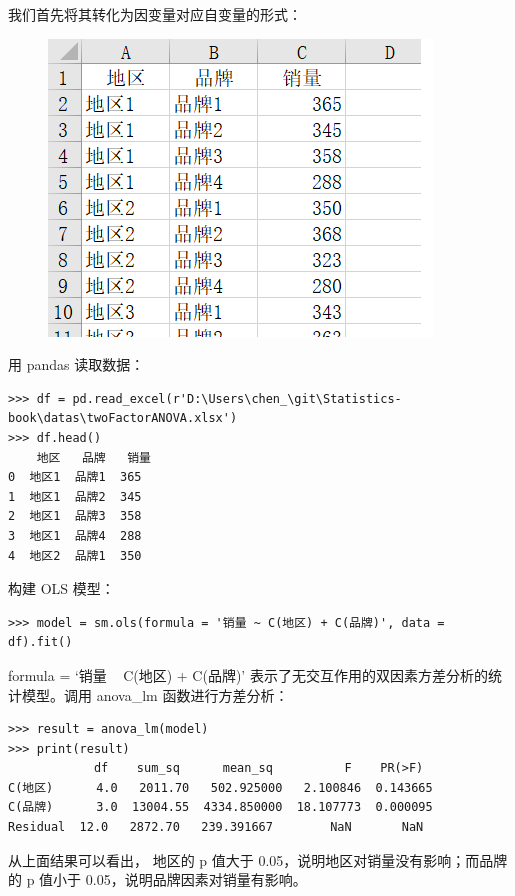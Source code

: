我们首先将其转化为因变量对应自变量的形式：

\begin{figure}[ht]
  \centering
  \includegraphics[scale=0.8]{figure/chapter3/twoFactor2.png}
\end{figure}

用 pandas 读取数据：

\begin{lstlisting}[Language=Python]
>>> df = pd.read_excel(r'D:\Users\chen_\git\Statistics-book\datas\twoFactorANOVA.xlsx')
>>> df.head()
    地区   品牌   销量
0  地区1  品牌1  365
1  地区1  品牌2  345
2  地区1  品牌3  358
3  地区1  品牌4  288
4  地区2  品牌1  350
\end{lstlisting}

构建 OLS 模型：

\begin{lstlisting}[Language=Python]
>>> model = sm.ols(formula = '销量 ~ C(地区) + C(品牌)', data = df).fit()
\end{lstlisting}

formula = `销量 ~ C(地区) + C(品牌)' 表示了无交互作用的双因素方差分析的统计模型。调用 anova\_lm 函数进行方差分析：

\begin{lstlisting}[Language=Python]
>>> result = anova_lm(model)
>>> print(result)
            df    sum_sq      mean_sq          F    PR(>F)
C(地区)      4.0   2011.70   502.925000   2.100846  0.143665
C(品牌)      3.0  13004.55  4334.850000  18.107773  0.000095
Residual  12.0   2872.70   239.391667        NaN       NaN
\end{lstlisting}

从上面结果可以看出， 地区的 p 值大于 0.05，说明地区对销量没有影响；而品牌的 p 值小于 0.05，说明品牌因素对销量有影响。

